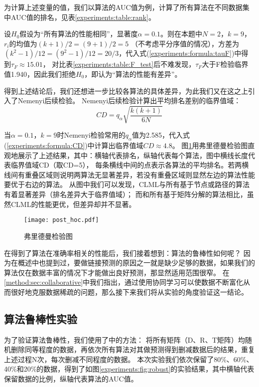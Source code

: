 为计算上述变量的值，我们以算法的AUC值为例，计算了所有算法在不同数据集中AUC值的排名，见表\ref{experiments:table:rank}。


设$H_0$假设为“所有算法的性能相同”，显著度$\alpha=0.1$。则在本题中$N=2$，$k=9$，$r_i$的均值为$(k+1)/2=(9+1)/2=5$
（不考虑平分序值的情况），方差为$(k^2-1)/12=(9^2-1)/12=20/3$，代入式(\ref{experiments:formula:tauF})中得到$\tau_F\approx{15.01}$，
对比表\ref{experiments:table:F_test}后不难发现，$\tau_F$大于F检验临界值1.940，因此我们拒绝$H_0$，即认为“算法的性能有差异”。


得到上述结论后，我们还想进一步比较各算法的具体差异，为此我们又在这之上引入了Nemenyi后续检验。
Nemenyi后续检验计算出平均排名差别的临界值域：
\begin{equation}
    CD=q_{\alpha}\sqrt{\frac{k(k+1)}{6N}}
    \label{experiments:formula:CD}
\end{equation}

当$\alpha=0.1$，$k=9$时Nemenyi检验常用的$q_{\alpha}$值为2.585，代入式(\ref{experiments:formula:CD})中计算出临界值域$CD\approx4.8$。
图\ref{experiments:fig:post_hoc}用弗里德曼检验图直观地展示了上述结果，其中：横轴代表排名，纵轴代表每个算法，图中横线长度代表临界值域CD（取CD=5），
每条横线中间的点表示各算法的平均排名。若两横线间有重叠区域则说明两算法无显著差异，若没有重叠区域则显然左边的算法性能要优于右边的算法。
从图中我们可以发现，CLML与所有基于节点或路径的算法有着显著差异（排名差异大于临界值域）；
而和所有基于矩阵分解的算法相比，虽然CLML的性能更优，但差异却并不显著。

\begin{figure}[]
    \centering
    \texttt{[image: post\_hoc.pdf]}
    \caption{弗里德曼检验图}
    \label{experiments:fig:post_hoc}
\end{figure}


在得到了算法在准确率相关的性能后，我们接着想到：算法的鲁棒性如何呢？
因为在概述中也提到过，要做链接预测的原因之一就是缺少足够的数据，如果我们的算法仅在数据丰富的情况下才能做出良好预测，那显然适用范围很窄。
在\ref{method:sec:collaborative}中我们指出，通过使用协同学习可以使数据不断富化从而很好地克服数据稀疏的问题，那么接下来我们将从实验的角度验证这一结论。


\subsection{算法鲁棒性实验}
为了验证算法鲁棒性，我们使用了\cite{cannistraci2013link}\cite{valverde2014link}\cite{hanley1982meaning}中的方法：
将所有矩阵（D、R、T矩阵）均随机删除同等程度的数据，再依次所有算法对其做预测得到删减数据后的结果，重复上述过程N次，每次删减不同程度的数据。
本次实验我们依次保留了80\%、60\%、40\%和20\%的数据，得到了如图\ref{experiments:fig:robust}的实验结果，其中横轴代表保留数据的比例，纵轴代表算法的AUC值。


